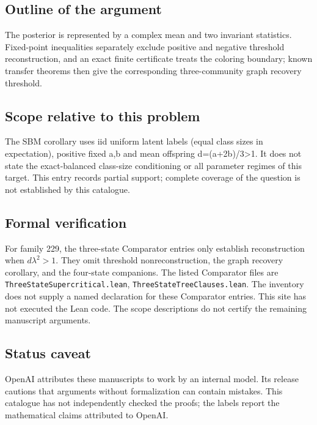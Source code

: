 \documentclass[11pt]{article}
\begin{document}
\subsection{Outline of the argument}
The posterior is represented by a complex mean and two invariant statistics. Fixed-point inequalities separately exclude positive and negative threshold reconstruction, and an exact finite certificate treats the coloring boundary; known transfer theorems then give the corresponding three-community graph recovery threshold.

\subsection{Scope relative to this problem}
The SBM corollary uses iid uniform latent labels (equal class sizes in expectation), positive fixed a,b and mean offspring d=(a+2b)/3>1. It does not state the exact-balanced class-size conditioning or all parameter regimes of this target. This entry records partial support; complete coverage of the question is not established by this catalogue.

\subsection{Formal verification}
For family 229, the three-state Comparator entries only establish reconstruction when $d\lambda^2>1$. They omit threshold nonreconstruction, the graph recovery corollary, and the four-state companions. The listed Comparator files are \texttt{ThreeStateSupercritical.lean}, \texttt{ThreeStateTreeClauses.lean}. The inventory does not supply a named declaration for these Comparator entries. This site has not executed the Lean code. The scope descriptions do not certify the remaining manuscript arguments.

\subsection{Status caveat}
OpenAI attributes these manuscripts to work by an internal model. Its release cautions that arguments without formalization can contain mistakes. This catalogue has not independently checked the proofs; the labels report the mathematical claims attributed to OpenAI.
\end{document}
